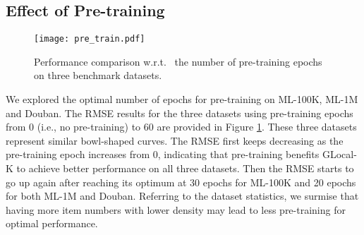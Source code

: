 \documentclass[sigconf]{acmart}
\begin{document}
\subsection{Effect of Pre-training}
\begin{figure}[t]
\vspace{-0.2cm}
\centering
\texttt{[image: pre\_train.pdf]}
\vspace{-0.35cm}
\caption{Performance comparison w.r.t.~ the number of pre-training epochs on three benchmark datasets.}
\label{fig:pre_train}
\vspace{-0.4cm}
\end{figure}
We explored the optimal number of epochs for pre-training on ML-100K, ML-1M and Douban. The RMSE results for the three datasets using pre-training epochs from 0 (i.e., no pre-training) to 60 are provided in Figure \ref{fig:pre_train}. These three datasets represent similar bowl-shaped curves. The RMSE first keeps decreasing as the pre-training epoch increases from 0, indicating that pre-training benefits GLocal-K to achieve better performance on all three datasets. Then the RMSE starts to go up again after reaching its optimum at 30 epochs for ML-100K and 20 epochs for both ML-1M and Douban. Referring to the dataset statistics, we surmise that having more item numbers with lower density may lead to less pre-training for optimal performance.
\end{document}
